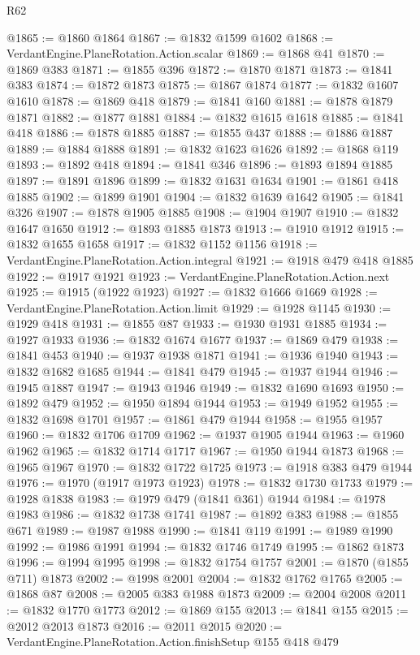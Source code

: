 \begin{lexlean}{R62}
\begin{coremodule}
@1865 := @1860 @1864
@1867 := @1832 @1599 @1602
@1868 := VerdantEngine.PlaneRotation.Action.scalar
@1869 := @1868 @41
@1870 := @1869 @383
@1871 := @1855 @396
@1872 := @1870 @1871
@1873 := @1841 @383
@1874 := @1872 @1873
@1875 := @1867 @1874
@1877 := @1832 @1607 @1610
@1878 := @1869 @418
@1879 := @1841 @160
@1881 := @1878 @1879 @1871
@1882 := @1877 @1881
@1884 := @1832 @1615 @1618
@1885 := @1841 @418
@1886 := @1878 @1885
@1887 := @1855 @437
@1888 := @1886 @1887
@1889 := @1884 @1888
@1891 := @1832 @1623 @1626
@1892 := @1868 @119
@1893 := @1892 @418
@1894 := @1841 @346
@1896 := @1893 @1894 @1885
@1897 := @1891 @1896
@1899 := @1832 @1631 @1634
@1901 := @1861 @418 @1885
@1902 := @1899 @1901
@1904 := @1832 @1639 @1642
@1905 := @1841 @326
@1907 := @1878 @1905 @1885
@1908 := @1904 @1907
@1910 := @1832 @1647 @1650
@1912 := @1893 @1885 @1873
@1913 := @1910 @1912
@1915 := @1832 @1655 @1658
@1917 := @1832 @1152 @1156
@1918 := VerdantEngine.PlaneRotation.Action.integral
@1921 := @1918 @479 @418 @1885
@1922 := @1917 @1921
@1923 := VerdantEngine.PlaneRotation.Action.next
@1925 := @1915 (@1922 @1923)
@1927 := @1832 @1666 @1669
@1928 := VerdantEngine.PlaneRotation.Action.limit
@1929 := @1928 @1145
@1930 := @1929 @418
@1931 := @1855 @87
@1933 := @1930 @1931 @1885
@1934 := @1927 @1933
@1936 := @1832 @1674 @1677
@1937 := @1869 @479
@1938 := @1841 @453
@1940 := @1937 @1938 @1871
@1941 := @1936 @1940
@1943 := @1832 @1682 @1685
@1944 := @1841 @479
@1945 := @1937 @1944
@1946 := @1945 @1887
@1947 := @1943 @1946
@1949 := @1832 @1690 @1693
@1950 := @1892 @479
@1952 := @1950 @1894 @1944
@1953 := @1949 @1952
@1955 := @1832 @1698 @1701
@1957 := @1861 @479 @1944
@1958 := @1955 @1957
@1960 := @1832 @1706 @1709
@1962 := @1937 @1905 @1944
@1963 := @1960 @1962
@1965 := @1832 @1714 @1717
@1967 := @1950 @1944 @1873
@1968 := @1965 @1967
@1970 := @1832 @1722 @1725
@1973 := @1918 @383 @479 @1944
@1976 := @1970 (@1917 @1973 @1923)
@1978 := @1832 @1730 @1733
@1979 := @1928 @1838
@1983 := @1979 @479 (@1841 @361) @1944
@1984 := @1978 @1983
@1986 := @1832 @1738 @1741
@1987 := @1892 @383
@1988 := @1855 @671
@1989 := @1987 @1988
@1990 := @1841 @119
@1991 := @1989 @1990
@1992 := @1986 @1991
@1994 := @1832 @1746 @1749
@1995 := @1862 @1873
@1996 := @1994 @1995
@1998 := @1832 @1754 @1757
@2001 := @1870 (@1855 @711) @1873
@2002 := @1998 @2001
@2004 := @1832 @1762 @1765
@2005 := @1868 @87
@2008 := @2005 @383 @1988 @1873
@2009 := @2004 @2008
@2011 := @1832 @1770 @1773
@2012 := @1869 @155
@2013 := @1841 @155
@2015 := @2012 @2013 @1873
@2016 := @2011 @2015
@2020 := VerdantEngine.PlaneRotation.Action.finishSetup @155 @418 @479

\end{coremodule}
\end{lexlean}
